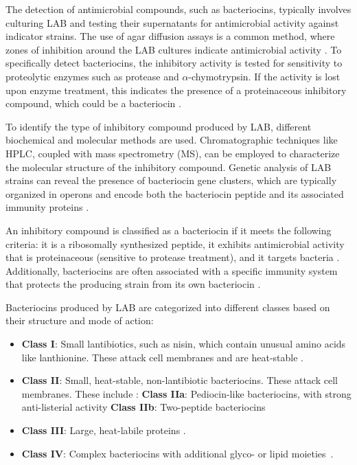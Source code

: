 The detection of antimicrobial compounds, such as bacteriocins, typically involves culturing LAB and testing their supernatants for antimicrobial activity against indicator strains. The use of agar diffusion assays is a common method, where zones of inhibition around the LAB cultures indicate antimicrobial activity \cite*{L3-LAB}. To specifically detect bacteriocins, the inhibitory activity is tested for sensitivity to proteolytic enzymes such as protease and $\alpha$-chymotrypsin. If the activity is lost upon enzyme treatment, this indicates the presence of a proteinaceous inhibitory compound, which could be a bacteriocin \cite*{L3-LAB}.

To identify the type of inhibitory compound produced by LAB, different biochemical and molecular methods are used. Chromatographic techniques like HPLC, coupled with mass spectrometry (MS), can be employed to characterize the molecular structure of the inhibitory compound. Genetic analysis of LAB strains can reveal the presence of bacteriocin gene clusters, which are typically organized in operons and encode both the bacteriocin peptide and its associated immunity proteins \cite*{L3-LAB}.

An inhibitory compound is classified as a bacteriocin if it meets the following criteria: it is a ribosomally synthesized peptide, it exhibits antimicrobial activity that is proteinaceous (sensitive to protease treatment), and it targets bacteria \cite*{L3-LAB}. Additionally, bacteriocins are often associated with a specific immunity system that protects the producing strain from its own bacteriocin \cite*{L3-LAB}.

Bacteriocins produced by LAB are categorized into different classes based on their structure and mode of action:
\begin{itemize}
    \item \textbf{Class I}: Small lantibiotics, such as nisin, which contain unusual amino acids like lanthionine. These attack cell membranes and are heat-stable \cite*{L3-LAB}.
    \item \textbf{Class II}: Small, heat-stable, non-lantibiotic bacteriocins. These attack cell membranes. These include \cite*{L3-LAB}:
    \subitem \textbf{Class IIa}: Pediocin-like bacteriocins, with strong anti-listerial activity
    \subitem \textbf{Class IIb}: Two-peptide bacteriocins
    \item \textbf{Class III}: Large, heat-labile proteins \cite*{L8-MicroInFood}.
    \item \textbf{Class IV}: Complex bacteriocins with additional glyco- or lipid moieties \cite*{L8-MicroInFood}.
\end{itemize}

